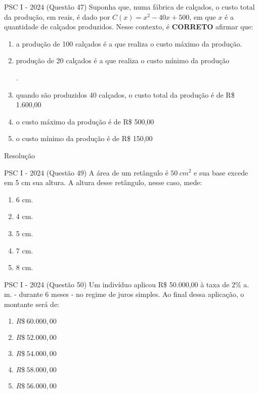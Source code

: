 \documentclass[aspectratio=169]{beamer}
\newif\ifusarcorvermelha
\newcommand{\vermelho}[1]{%
    \ifusarcorvermelha
        {\color{red}#1}%
    \else
        #1%
    \fi
}
\begin{document}
    \begin{frame}{PSC I - 2024 (Questão 47)}
        Suponha que, numa fábrica de calçados, o custo total da produção, em reais, é dado por $C(x) = x^{2}-40x+500$, em que $x$ é a quantidade de calçados produzidos. Nesse contexto, é \textbf{CORRETO} afirmar que:

            \begin{enumerate}[a]
                \item a produção de 100 calçados é a que realiza o custo máximo da produção.
                \item \vermelho{produção de 20 calçados é a que realiza o custo mínimo da produção}.  %
                \item quando são produzidos 40 calçados, o custo total da produção é de R\$ 1.600,00
                \item o custo máximo da produção é de R\$ 500,00
                \item o custo mínimo da produção é de R\$ 150,00
            \end{enumerate}
            
    \end{frame}

    \begin{frame}{Resolução}
        
    \end{frame}

    \begin{frame}{PSC I - 2024 (Questão 49)}
        A área de um retângulo é $50 \ cm^{2}$ e sua base excede em 5 cm sua altura. A altura desse retângulo, nesse caso, mede:
        
            \begin{enumerate}[a]
                \item 6 cm.
                \item 4 cm.
                \item \vermelho{5 cm.} %
                \item 7 cm.
                \item 8 cm.
            \end{enumerate}
            
    \end{frame}

    \begin{frame}{PSC I - 2024 (Questão 50)}
    Um indivíduo aplicou R\$ 50.000,00 à taxa de $2\%$ a. m. - durante 6 meses - no regime de juros simples. Ao final dessa aplicação, o montante será de:

        \begin{enumerate}[a]
            \item $R\$ \ 60.000,00$
            \item $R\$ \ 52.000,00$
            \item $R\$ \ 54.000,00$
            \item $R\$ \ 58.000,00$
            \item \vermelho{$R\$ \ 56.000,00$} %
        \end{enumerate}
                
    \end{frame}
\end{document}
